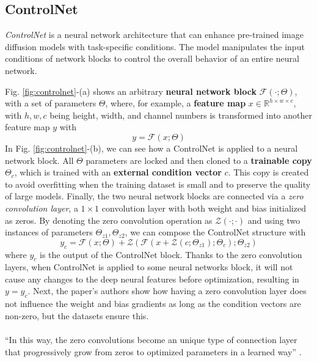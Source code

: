 \documentclass[preprint]{elsarticle}
\begin{document}
\subsection{ControlNet}
\emph{ControlNet} \cite{zhang2023adding} is a neural network architecture that can enhance 
pre-trained image diffusion models with task-specific conditions. 
The model manipulates the input conditions of network blocks to control the overall behavior of an entire neural network.


Fig. \ref{fig:controlnet}-(a) shows an arbitrary \textbf{neural network block} $\mathcal{F}(\cdot;\Theta)$, 
with a set of parameters $\Theta$,
where, for example, a \textbf{feature map} $x \in \mathbb{R}^{h\times w \times c}$, with ${h,w,c}$ 
being height, width, and channel numbers
is transformed into another feature map $y$ with
\begin{equation}
	y = \mathcal{F}(x;\Theta)
\end{equation}
In Fig. \ref{fig:controlnet}-(b), we can see how a ControlNet is applied to a neural network block.
All $\Theta$ parameters are locked and then cloned to a \textbf{trainable copy} $\Theta_c$, 
which is trained with an \textbf{external condition vector} $c$. 
This copy is created to avoid overfitting when the training dataset is small 
and to preserve the quality of large models. 
Finally, the two neural network blocks are connected via a \emph{zero convolution layer}, 
a $1\times1$ convolution layer with both weight and bias initialized as zeros.
By denoting the zero convolution operation as $\mathcal{Z}(\cdot;\cdot)$
and using two instances of parameters ${\Theta_{z1},\Theta_{z2}}$,
we can compose the ControlNet structure with
\begin{equation}
	y_c = \mathcal{F}(x;\Theta) + \mathcal{Z}(\mathcal{F}(x+\mathcal{Z}(c;\Theta_{z1});\Theta_c);\Theta_{z2})
\end{equation}
where $y_c$ is the output of the ControlNet block.
Thanks to the zero convolution layers, when ControlNet is applied to some neural networks block, 
it will not cause any changes to the deep neural features before optimization, resulting in $y=y_c$.
Next, the paper's authors show how having a zero convolution layer does not influence the weight 
and bias gradients as long as the condition vectors are non-zero, but the datasets ensure this.\\\\
``In this way, the 
zero convolutions become an unique type of connection layer that progressively grow from zeros to
optimized parameters in a learned way'' \cite{zhang2023adding}.\\
\end{document}
